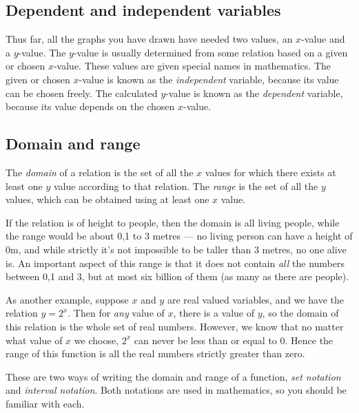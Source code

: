 \label{m39337*uid40}
\subsection*{Dependent and independent variables}
\nopagebreak
\label{m39337*id235764}Thus far, all the graphs you have drawn have needed two values, an $x$-value and a $y$-value. The $y$-value is usually determined from some relation based on a given or chosen $x$-value. These values are given special names in mathematics. The given or chosen $x$-value is known as the \textsl{independent} variable, because its value can be chosen freely. The calculated $y$-value is known as the \textsl{dependent} variable, because its value depends on the chosen $x$-value.\par 
\label{m39337*uid41}
\subsection*{Domain and range}
\nopagebreak
\label{m39337*id235855}The \textsl{domain} of a relation is the set of all the $x$ values for which there exists at least one $y$ value according to that relation. The \textsl{range} is the set of all the $y$ values, which can be obtained using at least one $x$ value.\par 
\label{m39337*id235908}If the relation is of height to people, then the domain is all living people, while the range would be about 0,1 to 3 metres --- no living person can have a height of 0m, and while strictly it's not impossible to be taller than 3 metres, no one alive is. An important aspect of this range is that it does not contain \textsl{all} the numbers between 0,1 and 3, but at most six billion of them (as many as there are people).\par 
\label{m39337*id235939}As another example, suppose $x$ and $y$ are real valued variables, and we have the relation $y={2}^{x}$. Then for \textsl{any} value of $x$, there is a value of $y$, so the domain of this relation is the whole set of real numbers. However, we know that no matter what value of $x$ we choose, ${2}^{x}$ can never be less than or equal to 0. Hence the range of this function is all the real numbers strictly greater than zero.\par 
\label{m39337*id236030}These are two ways of writing the domain and range of a function, \textsl{set notation} and \textsl{interval notation}. Both notations are used in mathematics, so you should be familiar with each.\par 
\label{m39337*uid42}
